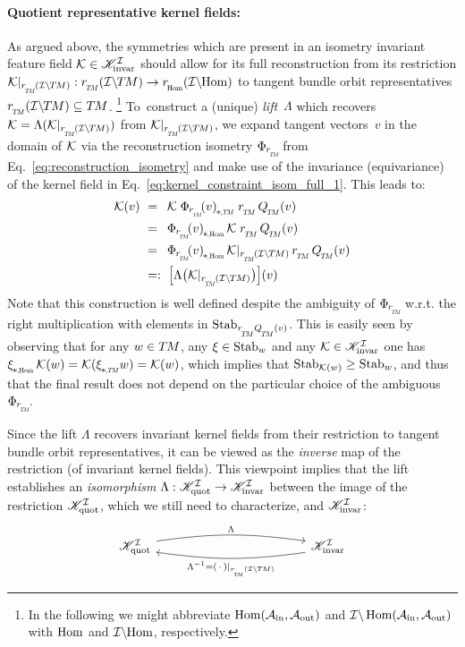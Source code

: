 \paragraph{Quotient representative kernel fields:}
As argued above, the symmetries which are present in an \mbox{isometry} \mbox{invariant} feature field $\mathcal{K} \in \mathscr{K}_\textup{invar}^{\mathcal{I}}$ should allow for its full reconstruction from its restriction ${\Krestr: \rTM(\ITM) \to \rHom(\IHom)}$ to tangent bundle orbit representatives $\rTM(\ITM) \subseteq \TM$.%
\footnote{
    In the following we might abbreviate $\operatorname{Hom}(\mathcal{A}_\textup{in},\mathcal{A}_\textup{out})$ and $\mathcal{I}\backslash \operatorname{Hom}(\mathcal{A}_\textup{in},\mathcal{A}_\textup{out})$ with $\operatorname{Hom}$ and $\mathcal{I}\backslash\mkern-4mu \operatorname{Hom}$, respectively.
}
To~construct a (unique) \emph{lift}~$\Lambda$ which recovers $\K = \Lambda(\Krestr)$ from $\Krestr$, we expand tangent vectors~$v$ in the domain of $\mathcal{K}$ via the reconstruction isometry $\PhirNoArg$ from Eq.~\eqref{eq:reconstruction_isometry} and make use of the invariance (equivariance) of the kernel field in Eq.~\eqref{eq:kernel_constraint_isom_full_1}.
This leads to:
\begin{align}\label{eq:lambda_construction}
    \K(v)
    \ &=\,\ \K\; \dPhirTM{v}\; \rTM\, \QTM (v) \notag \\
    \ &=\,\ \dPhirHom{v}\, \K\; \rTM\, \QTM (v) \notag \\
    \ &=\,\ \dPhirHom{v}\, \Krestr\, \rTM\, \QTM (v) \notag \\
    \ &=:\  \pig[ \Lambda\big(\Krestr\big) \pig] (v)
\end{align}
Note that this construction is well defined despite the ambiguity of $\PhirNoArg$ w.r.t. the right multiplication with elements in $\Stab{\rTM\QTM(v)}$.
This is easily seen by observing that for any $w \in T\mkern-1.5muM$, any $\xi \in \operatorname{Stab}_{w}$ and any $\mathcal{K} \in \mathscr{K}_\textup{invar}^{\mathcal{I}}$ one has $\dxiHom \K(w) = \K(\dxiTM w) = \K(w)$, which implies that $\operatorname{Stab}_{\mathcal{K}(w)} \geq \operatorname{Stab}_{w}$, and thus that the final result does not depend on the particular choice of the ambiguous $\PhirNoArg$.


Since the lift $\Lambda$ recovers invariant kernel fields from their restriction to tangent bundle orbit representatives, it can be viewed as the \emph{inverse} map of the restriction (of invariant kernel fields).
This viewpoint implies that the lift establishes an \emph{isomorphism} $\Lambda: \mathscr{K}_\textup{quot}^{\mathcal{I}} \to \mathscr{K}_\textup{invar}^{\mathcal{I}}$ between the image of the restriction $\mathscr{K}_\textup{quot}^{\mathcal{I}}$, which we still need to characterize, and $\mathscr{K}_\textup{invar}^{\mathcal{I}}$:
\begin{equation}
    \begin{tikzcd}[row sep=3.5em, column sep=12.em]
        \KIquot
            \arrow[r, bend left=8, shift left=2pt, "\Lambda"]
        &
        \KIfull
            \arrow[l, bend left=8, shift left=2pt, "\Lambda^{-1} = (\,\cdot\,)|_{\rTM(\ITM)}"]
    \end{tikzcd}
\end{equation}

